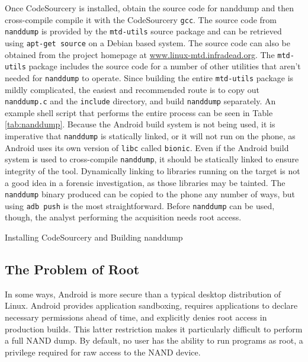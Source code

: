 Once CodeSourcery is installed, obtain the source code for nanddump and then cross-compile compile it with the CodeSourcery
\texttt{gcc}.  The source code from \texttt{nanddump} is provided by the \texttt{mtd-utils} source package and can be retrieved
using \texttt{apt-get source} on a Debian based system.  The source code can also be obtained from the project homepage at
\url{www.linux-mtd.infradead.org}.  The \texttt{mtd-utils} package includes the source code for a number of other utilities that
aren't needed for \texttt{nanddump} to operate.  Since building the entire \texttt{mtd-utils} package is mildly complicated, the
easiest and recommended route is to copy out \texttt{nanddump.c} and the \texttt{include} directory, and build \texttt{nanddump}
separately.  An example shell script that performs the entire process can be seen in Table \ref{tab:nanddump}.  Because the Android
build system is not being used, it is imperative that \texttt{nanddump} is statically linked, or it will not run on the phone, as
Android uses its own version of \texttt{libc} called \texttt{bionic}.  Even if the Android build system is used to cross-compile
\texttt{nanddump}, it should be statically linked to ensure integrity of the tool.  Dynamically linking to libraries running on the
target is not a good idea in a forensic investigation, as those libraries may be tainted.  The \texttt{nanddump} binary produced can
be copied to the phone any number of ways, but using \texttt{adb push} is the most straightforward.  Before \texttt{nanddump} can be
used, though, the analyst performing the acquisition needs root access.

\begin{table}

\caption{Installing CodeSourcery and Building nanddump}
\label{tab:nanddump}
\end{table}

\subsection{The Problem of Root}
In some ways, Android is more secure than a typical desktop distribution of Linux.  Android provides application sandboxing,
requires applications to declare necessary permissions ahead of time, and explicitly denies root access in production builds. This
latter restriction makes it particularly difficult to perform a full NAND dump.  By default, no user has the ability to run programs
as root, a privilege required for raw access to the NAND device.  

